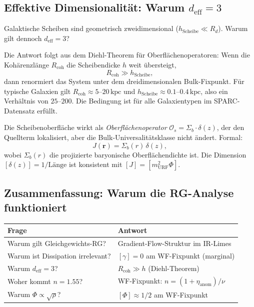 \documentclass[12pt,a4paper]{article}
\theoremstyle{definition}
\begin{document}
\subsection{Effektive Dimensionalität: Warum \texorpdfstring{$d_{\mathrm{eff}} = 3$}{d=3}}

Galaktische Scheiben sind geometrisch zweidimensional
($h_{\mathrm{Scheibe}} \ll R_d$). Warum gilt dennoch $d_{\mathrm{eff}} = 3$?

Die Antwort folgt aus dem Diehl-Theorem \cite{Diehl1986} für
Oberflächenoperatoren: Wenn die Kohärenzlänge $R_{\mathrm{coh}}$ die
Scheibendicke $h$ weit übersteigt,
\begin{equation}
  R_{\mathrm{coh}} \gg h_{\mathrm{Scheibe}},
\end{equation}
dann renormiert das System unter dem dreidimensionalen Bulk-Fixpunkt.
Für typische Galaxien gilt $R_{\mathrm{coh}} \approx 5$--$20\,\mathrm{kpc}$
und $h_{\mathrm{Scheibe}} \approx 0.1$--$0.4\,\mathrm{kpc}$, also ein
Verhältnis von $25$--$200$. Die Bedingung ist für alle Galaxientypen
im SPARC-Datensatz erfüllt.

Die Scheibenoberfläche wirkt als \emph{Oberflächenoperator}
$\mathcal{O}_s = \Sigma_b \cdot \delta(z)$, der den Quellterm lokalisiert,
aber die Bulk-Universalitätsklasse nicht ändert. Formal:
\begin{equation}
  J(\mathbf{r}) = \Sigma_b(r)\,\delta(z),
\end{equation}
wobei $\Sigma_b(r)$ die projizierte baryonische Oberflächendichte ist.
Die Dimension $[\delta(z)] = 1/\mathrm{Länge}$ ist konsistent mit
$[J] = [m_{\mathrm{URF}}^2\Phi]$.

\subsection{Zusammenfassung: Warum die RG-Analyse funktioniert}

\begin{center}
\begin{tabular}{p{5cm}p{7cm}}
\toprule
Frage & Antwort \\
\midrule
Warum gilt Gleichgewichts-RG? & Gradient-Flow-Struktur im IR-Limes \\
Warum ist Dissipation irrelevant? & $[\gamma] = 0$ am WF-Fixpunkt (marginal) \\
Warum $d_{\mathrm{eff}} = 3$? & $R_{\mathrm{coh}} \gg h$ (Diehl-Theorem) \\
Woher kommt $n = 1.55$? & WF-Fixpunkt: $n = (1+\eta_{\mathrm{anom}})/\nu$ \\
Warum $\Phi \propto \sqrt{\rho}$? & $[\Phi] \approx 1/2$ am WF-Fixpunkt \\
\bottomrule
\end{tabular}
\end{center}
\end{document}
